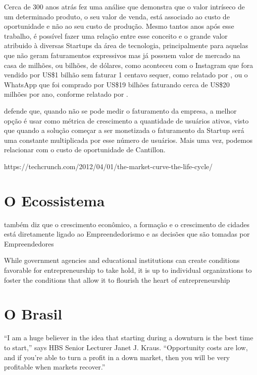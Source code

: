 Cerca de 300 anos atrás  fez uma análise que demonstra que o valor intríseco de um determinado produto, o seu valor de venda, está associado ao custo de oportunidade e não ao seu custo de produção. Mesmo tantos anos após esse trabalho, é possível fazer uma relação entre esse conceito e o grande valor atribuido à diversas Startups da área de tecnologia, principalmente para aquelas que não geram faturamentos expressivos mas já possuem valor de mercado na casa de milhões, ou bilhões, de dólares, como aconteceu com o Instagram que fora vendido por US\$1 bilhão sem faturar 1 centavo sequer, como relatado por , ou o WhatsApp que foi comprado por US\$19 bilhões faturando cerca de US\$20 milhões por ano, conforme relatado por . 

 defende que, quando não se pode medir o faturamento da empresa, a melhor opção é usar como métrica de crescimento a quantidade de usuários ativos, visto que quando a solução começar a ser monetizada o faturamento da Startup será uma constante multiplicada por esse número de usuários. Mais uma vez, podemos relacionar com o custo de oportunidade de Cantillon.

https://techcrunch.com/2012/04/01/the-market-curve-the-life-cycle/

\section{O Ecossistema}
\label{section:ecossistemas_e_suas_pecas}

 também diz que o crescimento econômico, a formação e o crescimento de cidades está diretamente ligado ao Empreendedorismo e as decisões que são tomadas por Empreendedores

While government agencies and educational institutions can create conditions favorable for entrepreneurship to take hold, it is up to individual organizations to foster the conditions that allow it to flourish the heart of entrepreneurship

\section{O Brasil}

“I am a huge believer in the idea that starting during a downturn is the best time to start,” says HBS Senior Lecturer Janet J. Kraus. “Opportunity costs are low, and if you’re able to turn a profit in a down market, then you will be very profitable when markets recover.”
